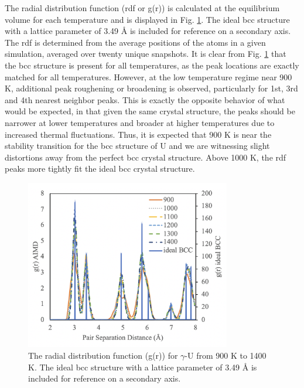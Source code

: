 \documentclass[review]{elsarticle}
\begin{document}
\FloatBarrier

The radial distribution function (rdf or g(r)) is calculated at the equilibrium volume for each temperature and is displayed in Fig. \ref{fig:rdf}. The ideal bcc structure with a lattice parameter of 3.49 {\AA} is included for reference on a secondary axis. The rdf is determined from the average positions of the atoms in a given simulation, averaged over twenty unique snapshots. It is clear from Fig. \ref{fig:rdf} that the bcc structure is present for all temperatures, as the peak locations are exactly matched for all temperatures. However, at the low temperature regime near 900 K, additional peak roughening or broadening is observed, particularly for 1st, 3rd and 4th nearest neighbor peaks. This is exactly the opposite behavior of what would be expected, in that given the same crystal structure, the peaks should be narrower at lower temperatures and broader at higher temperatures due to increased thermal fluctuations. Thus, it is expected that 900 K is near the stability transition for the bcc structure of U and we are witnessing slight distortions away from the perfect bcc crystal structure. Above 1000 K, the rdf peaks more tightly fit the ideal bcc crystal structure.

\begin{figure}[h]
 \centering
 \includegraphics[width=0.8\textwidth]{4_rdf.png} 
 \caption{The radial distribution function (g(r)) for $\gamma$-U from 900 K to 1400 K. The ideal bcc structure with a lattice parameter of 3.49 {\AA} is included for reference on a secondary axis.  }
 \label{fig:rdf}
\end{figure}

\FloatBarrier
\end{document}
